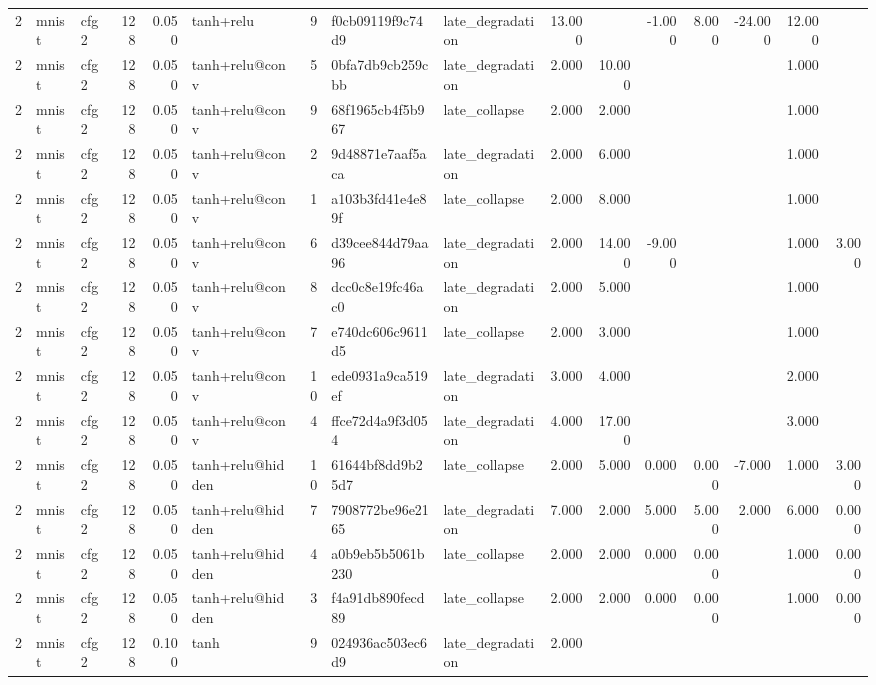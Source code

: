 \begin{table}[htbp]
{\begin{tabular}{@{}rllrrlrllrrrrrrr@{}}
2 & mnist & cfg2 & 128 & 0.050 & tanh+relu & 9 & f0cb09119f9c74d9 & late\_degradation & 13.000 &  & -1.000 & 8.000 & -24.000 & 12.000 &  \\
2 & mnist & cfg2 & 128 & 0.050 & tanh+relu@conv & 5 & 0bfa7db9cb259cbb & late\_degradation & 2.000 & 10.000 &  &  &  & 1.000 &  \\
2 & mnist & cfg2 & 128 & 0.050 & tanh+relu@conv & 9 & 68f1965cb4f5b967 & late\_collapse & 2.000 & 2.000 &  &  &  & 1.000 &  \\
2 & mnist & cfg2 & 128 & 0.050 & tanh+relu@conv & 2 & 9d48871e7aaf5aca & late\_degradation & 2.000 & 6.000 &  &  &  & 1.000 &  \\
2 & mnist & cfg2 & 128 & 0.050 & tanh+relu@conv & 1 & a103b3fd41e4e89f & late\_collapse & 2.000 & 8.000 &  &  &  & 1.000 &  \\
2 & mnist & cfg2 & 128 & 0.050 & tanh+relu@conv & 6 & d39cee844d79aa96 & late\_degradation & 2.000 & 14.000 & -9.000 &  &  & 1.000 & 3.000 \\
2 & mnist & cfg2 & 128 & 0.050 & tanh+relu@conv & 8 & dcc0c8e19fc46ac0 & late\_degradation & 2.000 & 5.000 &  &  &  & 1.000 &  \\
2 & mnist & cfg2 & 128 & 0.050 & tanh+relu@conv & 7 & e740dc606c9611d5 & late\_collapse & 2.000 & 3.000 &  &  &  & 1.000 &  \\
2 & mnist & cfg2 & 128 & 0.050 & tanh+relu@conv & 10 & ede0931a9ca519ef & late\_degradation & 3.000 & 4.000 &  &  &  & 2.000 &  \\
2 & mnist & cfg2 & 128 & 0.050 & tanh+relu@conv & 4 & ffce72d4a9f3d054 & late\_degradation & 4.000 & 17.000 &  &  &  & 3.000 &  \\
2 & mnist & cfg2 & 128 & 0.050 & tanh+relu@hidden & 10 & 61644bf8dd9b25d7 & late\_collapse & 2.000 & 5.000 & 0.000 & 0.000 & -7.000 & 1.000 & 3.000 \\
2 & mnist & cfg2 & 128 & 0.050 & tanh+relu@hidden & 7 & 7908772be96e2165 & late\_degradation & 7.000 & 2.000 & 5.000 & 5.000 & 2.000 & 6.000 & 0.000 \\
2 & mnist & cfg2 & 128 & 0.050 & tanh+relu@hidden & 4 & a0b9eb5b5061b230 & late\_collapse & 2.000 & 2.000 & 0.000 & 0.000 &  & 1.000 & 0.000 \\
2 & mnist & cfg2 & 128 & 0.050 & tanh+relu@hidden & 3 & f4a91db890fecd89 & late\_collapse & 2.000 & 2.000 & 0.000 & 0.000 &  & 1.000 & 0.000 \\
2 & mnist & cfg2 & 128 & 0.100 & tanh & 9 & 024936ac503ec6d9 & late\_degradation & 2.000 &  &  &  &  &  &  \\

\end{tabular}}
\end{table}
